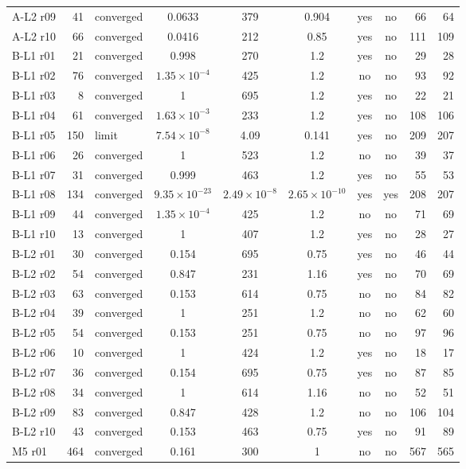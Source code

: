 {\begin{longtable}{lrlcccccrr}
A-L2 r09 & 41 & converged & 0.0633 & 379 & 0.904 & yes & no & 66 & 64 \\
A-L2 r10 & 66 & converged & 0.0416 & 212 & 0.85 & yes & no & 111 & 109 \\
B-L1 r01 & 21 & converged & 0.998 & 270 & 1.2 & yes & no & 29 & 28 \\
B-L1 r02 & 76 & converged & $1.35\times 10^{-4}$ & 425 & 1.2 & no & no & 93 & 92 \\
B-L1 r03 & 8 & converged & 1 & 695 & 1.2 & yes & no & 22 & 21 \\
B-L1 r04 & 61 & converged & $1.63\times 10^{-3}$ & 233 & 1.2 & yes & no & 108 & 106 \\
B-L1 r05 & 150 & limit & $7.54\times 10^{-8}$ & 4.09 & 0.141 & yes & no & 209 & 207 \\
B-L1 r06 & 26 & converged & 1 & 523 & 1.2 & no & no & 39 & 37 \\
B-L1 r07 & 31 & converged & 0.999 & 463 & 1.2 & yes & no & 55 & 53 \\
B-L1 r08 & 134 & converged & $9.35\times 10^{-23}$ & $2.49\times 10^{-8}$ & $2.65\times 10^{-10}$ & yes & yes & 208 & 207 \\
B-L1 r09 & 44 & converged & $1.35\times 10^{-4}$ & 425 & 1.2 & no & no & 71 & 69 \\
B-L1 r10 & 13 & converged & 1 & 407 & 1.2 & yes & no & 28 & 27 \\
B-L2 r01 & 30 & converged & 0.154 & 695 & 0.75 & yes & no & 46 & 44 \\
B-L2 r02 & 54 & converged & 0.847 & 231 & 1.16 & yes & no & 70 & 69 \\
B-L2 r03 & 63 & converged & 0.153 & 614 & 0.75 & no & no & 84 & 82 \\
B-L2 r04 & 39 & converged & 1 & 251 & 1.2 & no & no & 62 & 60 \\
B-L2 r05 & 54 & converged & 0.153 & 251 & 0.75 & no & no & 97 & 96 \\
B-L2 r06 & 10 & converged & 1 & 424 & 1.2 & yes & no & 18 & 17 \\
B-L2 r07 & 36 & converged & 0.154 & 695 & 0.75 & yes & no & 87 & 85 \\
B-L2 r08 & 34 & converged & 1 & 614 & 1.16 & no & no & 52 & 51 \\
B-L2 r09 & 83 & converged & 0.847 & 428 & 1.2 & no & no & 106 & 104 \\
B-L2 r10 & 43 & converged & 0.153 & 463 & 0.75 & yes & no & 91 & 89 \\
M5 r01 & 464 & converged & 0.161 & 300 & 1 & no & no & 567 & 565 \\

\end{longtable}}
